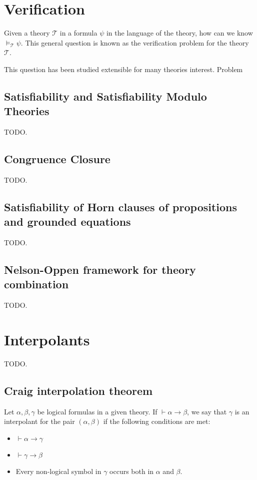 \section{Verification}

Given a theory $\mathcal{T}$ in a formula $\psi$ in the language of the theory, how can we know $\models_{\mathcal{T}} \psi$. This general question is known as the verification problem for the theory $\mathcal{T}$.

This question has been studied extensible for many theories interest. Problem 

\subsection{Satisfiability and Satisfiability Modulo Theories}
 
TODO.

\subsection{Congruence Closure}

TODO.

\subsection{Satisfiability of Horn clauses of propositions and grounded equations}

TODO.

\subsection{Nelson-Oppen framework for theory combination}


TODO.

\section{Interpolants}


TODO.

\subsection{Craig interpolation theorem}


Let $\alpha, \beta, \gamma$ be logical formulas in a given theory. If
$\vdash \alpha \rightarrow \beta$, we say that $\gamma$ is an
interpolant for the pair $(\alpha, \beta)$ if the following conditions
are met:

\begin{itemize}
\item $\vdash \alpha \rightarrow \gamma$
\item $\vdash \gamma \rightarrow \beta$
\item Every non-logical symbol in $\gamma$ occurs both in $\alpha$ and
  $\beta$.
\end{itemize}

